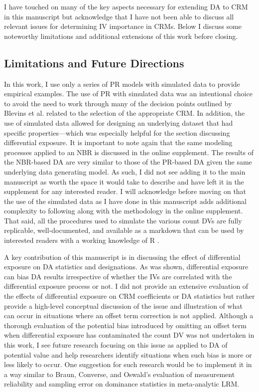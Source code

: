 \documentclass[ShortAfour,times,sageapa]{sagej}
\begin{document}
	I have touched on many of the key aspects necessary for extending DA to CRM in this manuscript but acknowledge that I have not been able to discuss all relevant issues for determining IV importance in CRMs.
	Below I discuss some noteworthy limitations and additional extensions of this work before closing.
	
	\subsection{Limitations and Future Directions}
	
	In this work, I use only a series of PR models with simulated data to provide empirical examples.
	The use of PR with simulated data was an intentional choice to avoid the need to work through many of the decision points outlined by Blevins et al. \citeyear{blevins2015count} related to the selection of the appropriate CRM.
	In addition, the use of simulated data allowed for designing an underlying dataset that had specific properties---which was especially helpful for the section discussing differential exposure.
	It is important to note again that the same modeling processes applied to an NBR is discussed in the online supplement.
	The results of the NBR-based DA are very similar to those of the PR-based DA given the same underlying data generating model.
	As such, I did not see adding it to the main manuscript as worth the space it would take to describe and have left it in the supplement for any interested reader.
	I will acknowledge before moving on that the use of the simulated data as I have done in this manuscript adds additional complexity to following along with the methodology in the online supplement.
	That said, all the procedures used to simulate the various count DVs are fully replicable, well-documented, and available as a markdown that can be used by interested readers with a working knowledge of R \cite{R}.
	
	A key contribution of this manuscript is in discussing the effect of differential exposure on DA statistics and designations.
	As was shown, differential exposure can bias DA results irrespective of whether the IVs are correlated with the differential exposure process or not.
	I did not provide an extensive evaluation of the effects of differential exposure on CRM coefficients or DA statistics but rather provide a high-level conceptual discussion of the issue and illustration of what can occur in situations where an offset term correction is not applied.
	Although a thorough evaluation of the potential bias introduced by omitting an offset term when differential exposure has contaminated the count DV was not undertaken in this work, I see future research focusing on this issue as applied to DA of potential value and help researchers identify situations when such bias is more or less likely to occur.
	One suggestion for such research would be to implement it in a way similar to Braun, Converse, and Oswald's \citeyear{braun2019accuracy} evaluation of measurement reliability and sampling error on dominance statistics in meta-analytic LRM.
	
\end{document}
